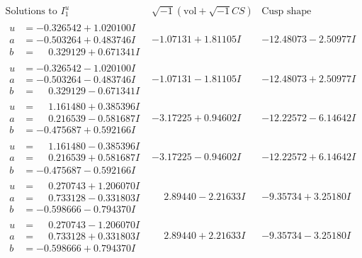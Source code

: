 \documentclass[1p]{elsarticle_modified}
\theoremstyle{definition}
\newcommand{\I}{\sqrt{-1}}
\begin{document}
$$\begin{array}{c|c|c}  
\text{Solutions to }I^u_{1}& \I (\text{vol} + \sqrt{-1}CS) & \text{Cusp shape}\\
 \hline 
\begin{aligned}
u &= -0.326542 + 1.020100 I \\
a &= -0.503264 + 0.483746 I \\
b &= \phantom{-}0.329129 + 0.671341 I\end{aligned}
 & -1.07131 + 1.81105 I & -12.48073 - 2.50977 I \\ \hline\begin{aligned}
u &= -0.326542 - 1.020100 I \\
a &= -0.503264 - 0.483746 I \\
b &= \phantom{-}0.329129 - 0.671341 I\end{aligned}
 & -1.07131 - 1.81105 I & -12.48073 + 2.50977 I \\ \hline\begin{aligned}
u &= \phantom{-}1.161480 + 0.385396 I \\
a &= \phantom{-}0.216539 - 0.581687 I \\
b &= -0.475687 + 0.592166 I\end{aligned}
 & -3.17225 + 0.94602 I & -12.22572 - 6.14642 I \\ \hline\begin{aligned}
u &= \phantom{-}1.161480 - 0.385396 I \\
a &= \phantom{-}0.216539 + 0.581687 I \\
b &= -0.475687 - 0.592166 I\end{aligned}
 & -3.17225 - 0.94602 I & -12.22572 + 6.14642 I \\ \hline\begin{aligned}
u &= \phantom{-}0.270743 + 1.206070 I \\
a &= \phantom{-}0.733128 - 0.331803 I \\
b &= -0.598666 - 0.794370 I\end{aligned}
 & \phantom{-}2.89440 - 2.21633 I & -9.35734 + 3.25180 I \\ \hline\begin{aligned}
u &= \phantom{-}0.270743 - 1.206070 I \\
a &= \phantom{-}0.733128 + 0.331803 I \\
b &= -0.598666 + 0.794370 I\end{aligned}
 & \phantom{-}2.89440 + 2.21633 I & -9.35734 - 3.25180 I \\ \hline\begin{aligned}

\end{aligned}
\end{array}$$
\end{document}
